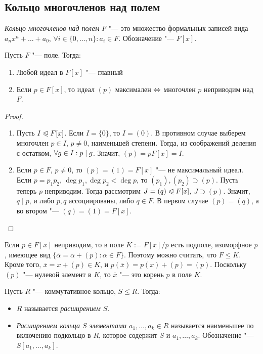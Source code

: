\subsection{Кольцо многочленов над полем}

\begin{reminder}
	\textit{Кольцо многочленов над полем} $F$ "--- это множество формальных записей вида $a_nx^n + \dotsc + a_0$, $\forall i \in \{0, \dotsc, n\} : a_i \in F$. Обозначение "--- $F[x]$.
\end{reminder}

\begin{theorem} Пусть $F$ "--- поле. Тогда:
	\begin{enumerate}
		\item Любой идеал в $F[x]$ "--- главный
		\item Если $p \in F[x]$, то идеал $(p)$ максимален $\Leftrightarrow$ многочлен $p$ неприводим над $F$.
	\end{enumerate}
\end{theorem}

\begin{proof}~
	\begin{enumerate}
		\item Пусть $I \trianglelefteqslant F[x]$. Если $I = \{0\}$, то $I = (0)$. В противном случае выберем многочлен $p \in I$, $p \ne 0$, наименьшей степени. Тогда, из соображений деления с остатком, $\forall g \hm\in I: p \mid g$. Значит, $(p) = pF[x] = I$.
		\item Если $p \in F$, $p \ne 0$, то $(p) = (1) = F[x]$ "--- не максимальный идеал. Если $p = p_1p_2$, $\deg{p_1}, \deg{p_2} < \deg{p}$, то $(p_1), (p_2) \supset (p)$. Пусть теперь $p$ неприводим. Тогда рассмотрим $J = (q) \trianglelefteqslant F[x]$, $J \supset (p)$. Значит, $q \mid p$, и либо $p, q$ ассоциированы, либо $q \in F$. В первом случае $(p) = (q)$, а во втором "--- $(q) = (1) = F[x]$.
	\end{enumerate}
\end{proof}

\begin{note}
	Если $p \in F[x]$ неприводим, то в поле $K := F[x] / p$ есть подполе, изоморфное $p$, имеющее вид $\{\overline{\alpha} = \alpha + (p): \alpha \in F\}$. Поэтому можно считать, что $F \le K$. Кроме того, $\overline{x} = x + (p) \in K$, и $p(\overline{x}) = p(x) + (p) = (p)$. Поскольку $(p)$ "--- нулевой элемент в $K$, то $\overline{x}$ "--- это корень $p$ в поле $K$.
\end{note}

\begin{definition}
	Пусть $R$ "--- коммутативное кольцо, $S \le R$. Тогда:
	\begin{itemize}
		\item $R$ называется \textit{расширением} $S$.
		\item \textit{Расширением кольца $S$ элементами $a_1, \dotsc, a_k \in R$} называется наименьшее по включению подкольцо в $R$, которое содержит $S$ и $a_1, \dotsc, a_k$. Обозначение "--- $S[a_1, \dotsc, a_k]$.
	\end{itemize}
\end{definition}


